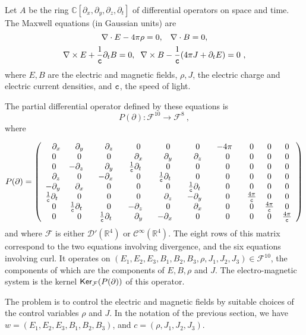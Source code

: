 \documentclass[11pt]{amsart}
\def\ker{\mathop{\sf Ker}}
\def\Cinf{\mathcal{C}^\infty}
\def\Dr{\mathcal{D}'}
\def\C{\mathbb{C}}
\def\R{\mathbb{R}}
\newcommand{\del}{\partial}
\newcommand{\F}{\mathcal{F}}
\begin{document}
{Let $A$ be the ring $\C[\del_x, \del_y, \del_z, \del_t]$ of differential operators on space and time. The Maxwell equations (in Gaussian units) are 
\[\nabla \cdot E - 4\pi \rho = 0, \hspace{.3cm}\nabla \cdot B = 0, \]
\[\nabla \times E + \frac{1}{\tt{c}} \del_t B = 0, \hspace{.2cm} \nabla \times B - \frac{1}{\tt{c}}(4\pi J +  \del_t E) = 0 ~, \]
where $E, B$ are the electric and magnetic fields, $\rho, J$, the electric charge and electric current densities, and $\tt{c}$, the speed of light.
 
The partial differential operator defined by  these equations is \[P(\del): \F^{10} \rightarrow \F^8 ~,\] where

{\small 
\[
P(\del)  = \left(
\begin{array}{lccccccccc}
 \phantom{-} \del_x & \del_y & \partial_z & 0 & 0 & 0 & -4 \pi \phantom{-} & 0 & 0 & 0 \\
\phantom{-} 0 & 0 & 0 & \del_x & \del_y & \del_z & 0 & 0 & 0 & 0 \\
\phantom{-} 0 & -\del_z \phantom{-} & \del_y & \frac{1}{\tt{c}}\del_t \phantom{-}& 0 & 0 & 0 & 0 & 0 & 0 \\
\phantom{-} \del_z & 0 & -\del_x \phantom{-} & 0 & \frac{1}{\tt{c}}\del_t \phantom{-}& 0 & 0 & 0 & 0 & 0 \\
-\del_y  & \del_x & 0 & 0 & 0 & \frac{1}{\tt{c}}\del_t \phantom{-}& 0 & 0 & 0 & 0 \\
\frac{1}{\tt{c}} \del_t  & 0 & 0 & 0 & \del_z  & -\del_y \phantom{-} & 0 & \frac{4\pi}{\tt{c}} & 0 & 0 \\
\phantom{-} 0 & \frac{1}{\tt{c}} \del_t \phantom{-}& 0 & -\del_z \phantom{-} & 0 &   \del_x  & 0 & 0 & \frac{4\pi}{\tt{c}} & 0 \\
\phantom{-} 0 & 0 & \frac{1}{\tt{c}}\del_t \phantom{-} &  \del_y & - \del_x \phantom{-} & 0 & 0 & 0 & 0 & \frac{4\pi}{\tt{c}}
\end{array}
\right)
\]}and where $\F$ is either $\Dr(\R^4)$ or $\Cinf(\R^4)$. The eight rows of this matrix correspond to the two equations involving divergence, and the six equations involving curl. It operates on 
$(E_1, E_2, E_3, B_1, B_2, B_3, \rho, J_1, J_2, J_3) \in \F^{10}$, the components of which are the components of $E, B, \rho$ and $J$. The electro-magnetic system is the kernel $\ker_\F(P(\del)) $ of this operator.

The problem is to control the electric and magnetic fields by suitable choices of the control variables $\rho$ and $J$. In the notation of the previous section, we have $w = (E_1, E_2, E_3, B_1, B_2, B_3)$, and $c = (\rho, J_1, J_2, J_3)$.

}
\end{document}

